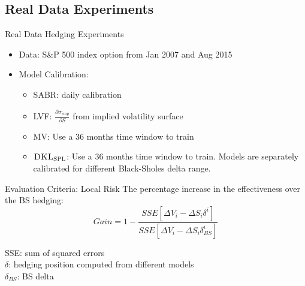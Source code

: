 \documentclass[10pt,table,mathserif]{beamer}
\newcommand{\DKLs}{\bf\textsc{DKL}_{\text{SPL}}}
\begin{document}
\subsection{Real Data Experiments}
\begin{frame}{Real Data  Hedging Experiments}
\begin{itemize}
  \item Data: S\&P 500 index option from Jan 2007 and Aug 2015
  \item Model Calibration:
    \begin{itemize}
      \item SABR: daily calibration
      \item LVF: $\frac{\partial \sigma_{imp}}{ \partial S}$ from implied volatility surface
      \item MV: Use a 36 months time window to train
      \item $\DKLs$: Use a 36 months time window to train. Models are separately calibrated for different Black-Sholes delta range.
    \end{itemize}
  \end{itemize}
\end{frame}

\begin{frame}{Evaluation Criteria: Local Risk}
The percentage increase in the effectiveness over the BS hedging:
\[
Gain=1-\frac{SSE[\Delta V_i-\Delta S_i\delta^i]}{SSE[\Delta V_i-\Delta S_i\delta^i_{BS}]}
\]
\begin{center}

SSE: sum of squared errors\\
 $\delta$: hedging position computed from different models\\
 $\delta_{BS}$: BS delta\\
 \end{center}
\end{frame}
\end{document}
